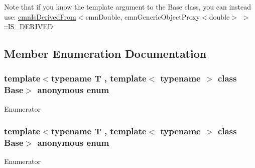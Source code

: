 Note that if you know the template argument to the Base class, you can instead use\-: \hyperlink{classcmn_is_derived_from}{cmn\-Is\-Derived\-From}$<$cmn\-Double, cmn\-Generic\-Object\-Proxy$<$double$>$ $>$\-::\-I\-S\-\_\-\-D\-E\-R\-I\-V\-E\-D 

\subsection{Member Enumeration Documentation}
\hypertarget{classcmn_is_derived_from_templated_adf75555e9b3ea5b7cca26092a9a621bf}{\subsubsection[{anonymous enum}]{\setlength{\rightskip}{0pt plus 5cm}template$<$typename T , template$<$ typename $>$ class Base$>$ anonymous enum}}\label{classcmn_is_derived_from_templated_adf75555e9b3ea5b7cca26092a9a621bf}
\begin{Desc}
\item[Enumerator]\par
\begin{description}
\item[{\em 
\hypertarget{classcmn_is_derived_from_templated_adf75555e9b3ea5b7cca26092a9a621bfa946c9ccdd650ead37b23ab1cb284f2ca}{I\-S\-\_\-\-D\-E\-R\-I\-V\-E\-D}\label{classcmn_is_derived_from_templated_adf75555e9b3ea5b7cca26092a9a621bfa946c9ccdd650ead37b23ab1cb284f2ca}
}]\end{description}
\end{Desc}
\hypertarget{classcmn_is_derived_from_templated_aff833aa4b3d8a186921ab9f2ddb20887}{\subsubsection[{anonymous enum}]{\setlength{\rightskip}{0pt plus 5cm}template$<$typename T , template$<$ typename $>$ class Base$>$ anonymous enum}}\label{classcmn_is_derived_from_templated_aff833aa4b3d8a186921ab9f2ddb20887}
\begin{Desc}
\item[Enumerator]\par
\begin{description}
\item[{\em 
\hypertarget{classcmn_is_derived_from_templated_aff833aa4b3d8a186921ab9f2ddb20887a762073f61bb9b926aba5b4f227f3e6d8}{I\-S\-\_\-\-N\-O\-T\-\_\-\-D\-E\-R\-I\-V\-E\-D}\label{classcmn_is_derived_from_templated_aff833aa4b3d8a186921ab9f2ddb20887a762073f61bb9b926aba5b4f227f3e6d8}
}]\end{description}
\end{Desc}


